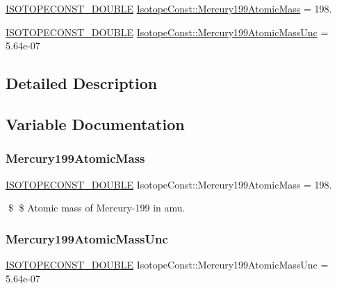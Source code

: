 \begin{DoxyCompactItemize}
\item 
\mbox{\hyperlink{group___isotope_const-_macros_ga8f45a7272ce02c0b4c65c44636ed719a}{I\+S\+O\+T\+O\+P\+E\+C\+O\+N\+S\+T\+\_\+\+D\+O\+U\+B\+LE}} \mbox{\hyperlink{group___isotope_const-_mercury-_hg199_gadb4e9e3a96b24dd2d3b0c578afacaac5}{Isotope\+Const\+::\+Mercury199\+Atomic\+Mass}} = 198.
\item 
\mbox{\hyperlink{group___isotope_const-_macros_ga8f45a7272ce02c0b4c65c44636ed719a}{I\+S\+O\+T\+O\+P\+E\+C\+O\+N\+S\+T\+\_\+\+D\+O\+U\+B\+LE}} \mbox{\hyperlink{group___isotope_const-_mercury-_hg199_ga1e74f0ae8e98f410cc0d332ff5975503}{Isotope\+Const\+::\+Mercury199\+Atomic\+Mass\+Unc}} = 5.\+64e-\/07
\end{DoxyCompactItemize}


\subsection{Detailed Description}


\subsection{Variable Documentation}
\mbox{\label{group___isotope_const-_mercury-_hg199_gadb4e9e3a96b24dd2d3b0c578afacaac5}} 
\subsubsection{\texorpdfstring{Mercury199\+Atomic\+Mass}{Mercury199AtomicMass}}
{\footnotesize\ttfamily \mbox{\hyperlink{group___isotope_const-_macros_ga8f45a7272ce02c0b4c65c44636ed719a}{I\+S\+O\+T\+O\+P\+E\+C\+O\+N\+S\+T\+\_\+\+D\+O\+U\+B\+LE}} Isotope\+Const\+::\+Mercury199\+Atomic\+Mass = 198.}

\$ \$ Atomic mass of Mercury-\/199 in amu. \mbox{\label{group___isotope_const-_mercury-_hg199_ga1e74f0ae8e98f410cc0d332ff5975503}} 
\subsubsection{\texorpdfstring{Mercury199\+Atomic\+Mass\+Unc}{Mercury199AtomicMassUnc}}
{\footnotesize\ttfamily \mbox{\hyperlink{group___isotope_const-_macros_ga8f45a7272ce02c0b4c65c44636ed719a}{I\+S\+O\+T\+O\+P\+E\+C\+O\+N\+S\+T\+\_\+\+D\+O\+U\+B\+LE}} Isotope\+Const\+::\+Mercury199\+Atomic\+Mass\+Unc = 5.\+64e-\/07}

